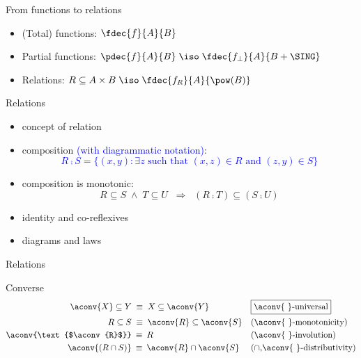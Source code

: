 \documentclass{beamer}
\def\dimp{\mathbin{\equiv}}
\def\imp{\mathbin{\Rightarrow}}
\def\e{\mathbin{\wedge}}
\begin{document}
\begin{slide}{From functions to relations}

\begin{itemize}
\item (Total) functions: $\fdec{f}{A}{B}$
\item Partial functions: $\pdec{f}{A}{B}  \; \iso\; \fdec{f_{\bot}}{A}{B + \SING}$
\item Relations:  $R \subseteq A \times B  \; \iso\; \fdec{f_R}{A}{\pow(B)}$
\end{itemize}
\end{slide}

\begin{slide}{Relations}

\begin{itemize}
\item concept of relation
\item composition \textcolor{blue}{(with diagrammatic notation)}:\\
\textcolor{blue}{\begin{equation*}
R\comp S = \{(x,y): \exists z \text{ such that } (x,z)\in R \text{ and } (z,y)\in S\}
\end{equation*}}
\item composition is  monotonic:
\begin{equation*}
R \subseteq S\; \e\; T \subseteq U\; \; \imp\;\;
        (R \comp  T) \subseteq (S \comp U)
\end{equation*}

\item identity and co-reflexives
\item diagrams and laws
\end{itemize}
\end{slide}

\begin{slide}{Relations}

\begin{block}{Converse}
\begin{align*}
\aconv{X} \subseteq Y\; & \equiv\; X \subseteq \aconv{Y} & & \text{\fbox{$\aconv{~}$-universal}}
\\
R \subseteq S\;  &\equiv\; \aconv{R} \subseteq \aconv{S} &
 &  \text{($\aconv{~}$-monotonicity)} \label{rel:cmonooo}\\
\aconv{\text{$\aconv{R}$}} \; & \dimp \; R & & \text{($\aconv{~}$-involution)} %
\\
\aconv{(R \cap S)}\; & \dimp\; \aconv{R} \cap \aconv{S} &
 &  \text{($\cap$,$\aconv{~}$-distributivity)} %
\end{align*}
\end{block}
\end{slide}
\end{document}
